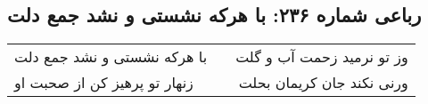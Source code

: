 \begin{center}
\section*{رباعی شماره ۲۳۶: با هرکه نشستی و نشد جمع دلت}
\label{sec:0236}
\begin{longtable}{l p{0.5cm} r}
با هرکه نشستی و نشد جمع دلت
&&
وز تو نرمید زحمت آب و گلت
\\
زنهار تو پرهیز کن از صحبت او
&&
ورنی نکند جان کریمان بحلت
\\
\end{longtable}
\end{center}
